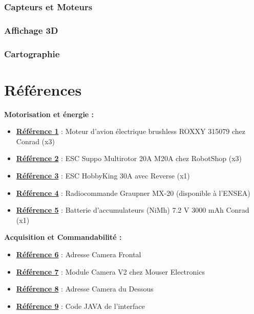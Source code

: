 \documentclass[a4paper,11pt]{report}
\begin{document}
		\subsection{Capteurs et Moteurs}
		
		\subsection{Affichage 3D}
			\label{subsec:Affichage 3D}
			
		\subsection{Cartographie}
			\label{subsec:Cartographie}
		

\chapter{Références}

				\textbf{Motorisation et énergie :}
				\begin{itemize}
							\item \textbf{\href{http://www.conrad.fr/ce/fr/product/231891/Moteur-davion-lectrique-brushless-ROXXY-315079?ref=searchDetail}{Référence 1}} : Moteur d'avion électrique brushless ROXXY 315079 chez Conrad (x3)
							\item \textbf{\href{https://www.robotshop.com/eu/fr/esc-multirotor-20a-m20a.html}{Référence 2}} : ESC Suppo Multirotor 20A M20A chez RobotShop (x3)
							\item \textbf{\href{https://hobbyking.com/fr_fr/hobbykingr-tm-brushless-car-esc-30a-w-reverse.html}{Référence 3}} : ESC HobbyKing 30A avec Reverse (x1)
							\item \textbf{\href{https://www.topmodel.fr/product-detail-18656-graupner-mx-20-hott-12160?lang=fr}{Référence 4}} : Radiocommande Graupner MX-20 (disponible à l'ENSEA)
							\item \textbf{\href{http://www.conrad.fr/ce/fr/product/206028/Batterie-daccumulateurs-NiMh-72-V-3000-mAh-Conrad-energy-206028-stick-fiche-Tamiya-mle?ref=searchDetail}{Référence 5}} : Batterie d'accumulateurs (NiMh) 7.2 V 3000 mAh Conrad (x1)
				\end{itemize}
				
				\textbf{Acquisition et Commandabilité :}
				 \begin{itemize}
							\item \textbf{\href{http://169.254.14.03:8081/}{Référence 6}} : Adresse Camera Frontal
							\item \textbf{\href{https://www.mouser.fr/ProductDetail/SparkFun/DEV-14028?qs=sGAEpiMZZMsB9HsreUc \%252biQuTz4\%2fXD\%2fVgeee971KrtC4\%3d}{Référence 7}} : Module Camera V2 chez Mouser Electronics
							\item \textbf{\href{http://169.254.14.03:8000/}{Référence 8}} : Adresse Camera du Dessous
							\item \textbf{\href{https://github.com/ROV-Nautilus/Nautilus/tree/master/Interface}{Référence 9}} : Code JAVA de l'interface
				\end{itemize}
\end{document}
